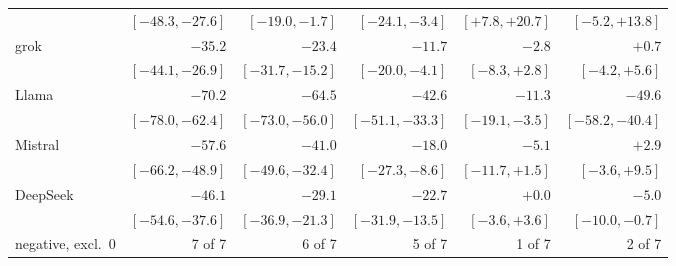 \begin{table}[t]
{\begin{tabular}{@{}lrrrrr@{}}
 & $[-48.3, -27.6]$ & $[-19.0, -1.7]$ & $[-24.1, -3.4]$ & $[+7.8, +20.7]$ & $[-5.2, +13.8]$ \\[1pt]
grok & $-35.2$ & $-23.4$ & $-11.7$ & $-2.8$ & $+0.7$ \\
 & $[-44.1, -26.9]$ & $[-31.7, -15.2]$ & $[-20.0, -4.1]$ & $[-8.3, +2.8]$ & $[-4.2, +5.6]$ \\[1pt]
Llama & $-70.2$ & $-64.5$ & $-42.6$ & $-11.3$ & $-49.6$ \\
 & $[-78.0, -62.4]$ & $[-73.0, -56.0]$ & $[-51.1, -33.3]$ & $[-19.1, -3.5]$ & $[-58.2, -40.4]$ \\[1pt]
Mistral & $-57.6$ & $-41.0$ & $-18.0$ & $-5.1$ & $+2.9$ \\
 & $[-66.2, -48.9]$ & $[-49.6, -32.4]$ & $[-27.3, -8.6]$ & $[-11.7, +1.5]$ & $[-3.6, +9.5]$ \\[1pt]
DeepSeek & $-46.1$ & $-29.1$ & $-22.7$ & $+0.0$ & $-5.0$ \\
 & $[-54.6, -37.6]$ & $[-36.9, -21.3]$ & $[-31.9, -13.5]$ & $[-3.6, +3.6]$ & $[-10.0, -0.7]$ \\[1pt]
\midrule
negative, excl.\ 0 & 7 of 7 & 6 of 7 & 5 of 7 & 1 of 7 & 2 of 7 \\
\bottomrule
\end{tabular}}
\end{table}

